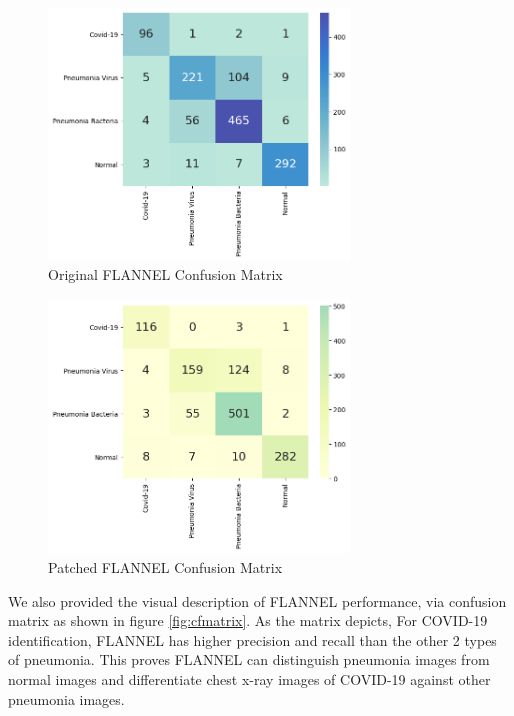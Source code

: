 \documentclass{sigkddExp}
\begin{document}
\begin{figure}
    \centering
    \includegraphics[width=8cm]{../doc/images/base_flannel_cf.png}
    \caption{Original FLANNEL Confusion Matrix}
\end{figure}
\begin{figure}
    \centering
    \includegraphics[width=8cm]{../doc/images/patched_flannel_cf.png}
    \caption{Patched FLANNEL Confusion Matrix}
\end{figure}




We also provided the visual description of FLANNEL performance, via confusion
matrix as shown in figure \ref{fig:cfmatrix}. As the matrix depicts, For
COVID-19 identification, FLANNEL has higher precision and recall than the other
2 types of pneumonia. This proves FLANNEL can distinguish pneumonia images from
normal images and differentiate chest x-ray images of COVID-19 against other
pneumonia images.
\end{document}
